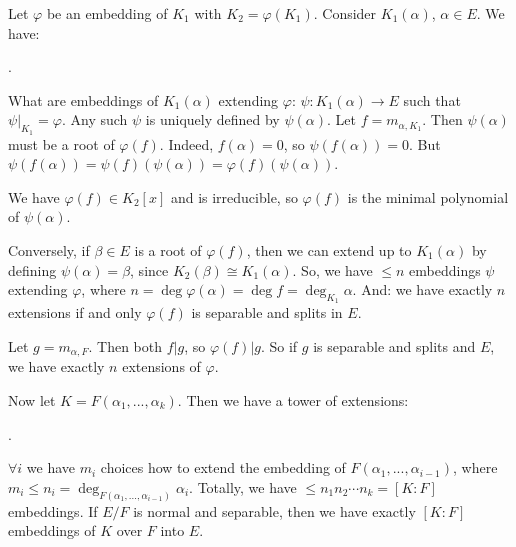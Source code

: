 \documentclass[9pt,reqno,twoside]{amsbook}
\theoremstyle{plain}
\numberwithin{section}{chapter}
\numberwithin{equation}{chapter}
\theoremstyle{definition}
\theoremstyle{remark}
\theoremstyle{plain}
\renewcommand{\leq}{\leqslant}
\renewcommand{\phi}{\varphi}
\begin{document}
Let $\phi$ be an embedding of $K_1$ with $K_2 = \phi(K_1)$. Consider $K_1(\alpha)$, $\alpha \in E$. We have:
\begin{center}
.
\end{center}
What are embeddings of $K_1(\alpha)$ extending $\phi$: $\psi:K_1(\alpha) \to E$ such that $\psi|_{K_1} = \phi$. Any such $\psi$ is uniquely defined by $\psi(\alpha)$. Let $f = m_{\alpha,K_1}$. Then $\psi(\alpha)$ must be a root of $\phi(f)$. Indeed, $f(\alpha) = 0$, so $\psi(f(\alpha)) = 0$. But $\psi(f(\alpha)) = \psi(f)(\psi(\alpha)) = \phi(f)(\psi(\alpha))$. 

We have $\phi(f) \in K_2[x]$ and is irreducible, so $\phi(f)$ is the minimal polynomial of $\psi(\alpha)$. 

Conversely, if $\beta \in E$ is a root of $\phi(f)$, then we can extend up to $K_1(\alpha)$ by defining $\psi(\alpha) = \beta$, since $K_2(\beta) \cong K_1(\alpha)$. So, we have $\leq n$ embeddings $\psi$ extending $\phi$, where $n = \deg\phi(\alpha) = \deg f = \deg_{K_1}\alpha$. And: we have exactly $n$ extensions if and only $\phi(f)$ is separable and splits in $E$. 


Let $g =m_{\alpha,F}$. Then both $f|g$, so $\phi(f)|g$. So if $g$ is separable and splits and $E$, we have exactly $n$ extensions of $\phi$. 


Now let $K = F(\alpha_1,...,\alpha_k)$. Then we have a tower of extensions:
\begin{center}
.
\end{center}
$\forall i$ we have $m_i$ choices how to extend the embedding of $F(\alpha_1,...,\alpha_{i - 1})$, where $m_i \leq n_i = \deg_{F(\alpha_1,...,\alpha_{i  -1})}\alpha_i$. Totally, we have $\leq  n_1n_2\cdots n_k = [K:F]$ embeddings. If $E/F$ is normal and separable, then we have exactly $[K:F]$ embeddings of $K$ over $F$ into $E$. 
\end{document}
